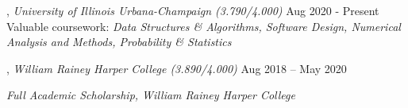 

, \textit{University of Illinois Urbana-Champaign (3.790/4.000)} \hfill	Aug 2020 - Present \\

Valuable coursework: \textit{Data Structures \& Algorithms, Software Design, Numerical Analysis and Methods, Probability \& Statistics} \newline 

, \textit{William Rainey Harper College (3.890/4.000)}	\hfill Aug 2018 -- May 2020

\textit{Full Academic Scholarship, William Rainey Harper College} \hfill	



